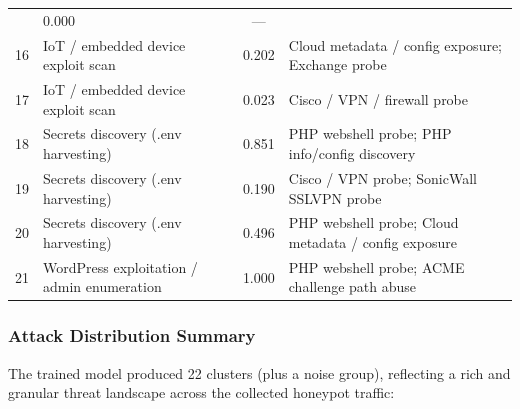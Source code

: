 \documentclass[12pt, a4paper]{report}   %
\begin{document}
\begin{table}[H]
\begin{tabularx}{\textwidth}{cXcX}
& 0.000 & --- \\
16  & IoT / embedded device exploit scan            
& 0.202 & Cloud metadata / config exposure; Exchange probe \\
17  & IoT / embedded device exploit scan            
& 0.023 & Cisco / VPN / firewall probe \\
18  & Secrets discovery (.env harvesting)           
& 0.851 & PHP webshell probe; PHP info/config discovery \\
19  & Secrets discovery (.env harvesting)           
& 0.190 & Cisco / VPN probe; SonicWall SSLVPN probe \\
20  & Secrets discovery (.env harvesting)           
& 0.496 & PHP webshell probe; Cloud metadata / config exposure \\
21  & WordPress exploitation / admin enumeration    
& 1.000 & PHP webshell probe; ACME challenge path abuse \\
\bottomrule
\end{tabularx}
\end{table}

\subsubsection{Attack Distribution Summary}
The trained model produced 22 clusters (plus a noise group), reflecting a 
rich and granular threat landscape across the collected honeypot traffic:
\end{document}
